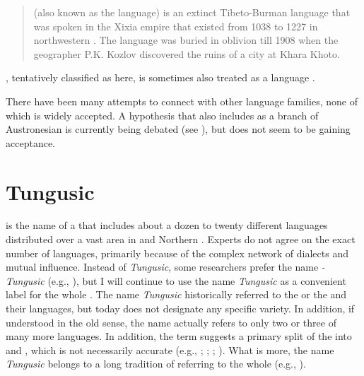 \begin{quote}
 (also known as the  language) is an extinct Tibeto-Burman language that was spoken in the Xixia empire that existed from 1038 to 1227 in northwestern . The language was buried in oblivion till 1908 when the  geographer P.K. Kozlov discovered the ruins of a  city at Khara Khoto. \citep[602]{Gong2003}
\end{quote}

, tentatively classified as  here, is sometimes also treated as a  language \citep[139]{Chirkova2012}.

There have been many attempts to connect  with other language families, none of which is widely accepted. A \textit{} hypothesis that also includes  as a branch of Austronesian is currently being debated (see \citealt{Sagart2016}), but does not seem to be gaining acceptance.

\section{Tungusic}\label{sec:2.10}

 is the name of a  that includes about a dozen to twenty different languages distributed over a vast area in  and Northern . Experts do not agree on the exact number of languages, primarily because of the complex network of dialects and mutual influence. Instead of \textit{Tungusic}, some researchers prefer the name \textit{-Tungusic} (e.g., \citealt{Pevnov2012}), but I will continue to use the name \textit{Tungusic} as a convenient label for the whole . The name \textit{Tungusic} historically referred to the  or the  and their languages, but today does not designate any specific variety. In addition, if understood in the old sense, the name \textit{} actually refers to only two or three of many more languages. In addition, the term suggests a primary split of the  into  and , which is not necessarily accurate (e.g., \citealt{Ikegami1974}; \citealt{Georg2004}; \citealt{Janhunen2012b}; \citealt{Hölzl2015a,Hölzl2017b}). What is more, the name \textit{Tungusic} belongs to a long tradition of referring to the whole  (e.g., \citealt{Benzing1956}).

